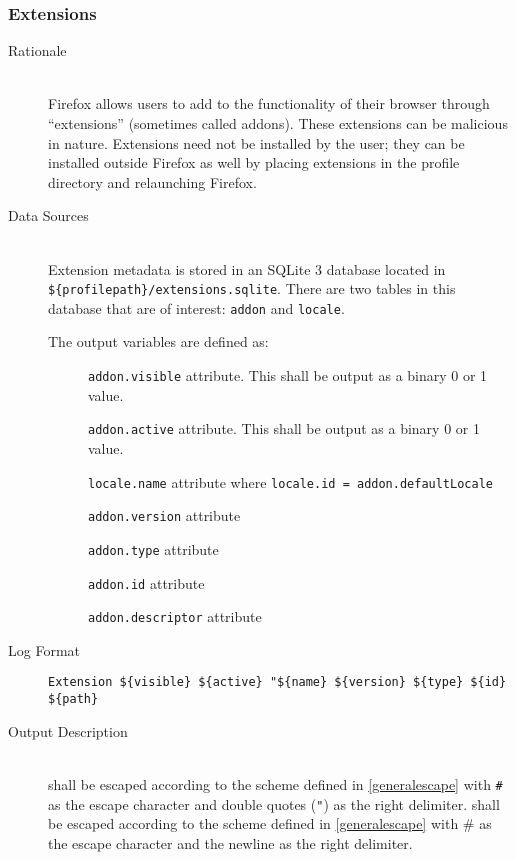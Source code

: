 \subsubsection{Extensions}
\begin{description}
\item[Rationale] \hfill \\
Firefox allows users to add to the functionality of their browser through
``extensions'' (sometimes called addons).  These extensions can be malicious in
nature.  Extensions need not be installed by the user; they can be installed
outside Firefox as well by placing extensions in the profile directory and
relaunching Firefox.  
\item[Data Sources] \hfill \\
Extension metadata is stored in an SQLite 3 database located in \\
\verb|${profilepath}/extensions.sqlite|.  There are two tables in this database
that are of interest: \verb|addon| and \verb|locale|. 
 
The output variables are defined as:
\begin{description}
  \item[] \verb|addon.visible| attribute.  This shall be output as
  a binary 0 or 1 value.
  \item[] \verb|addon.active| attribute.  This shall be output as a
  binary 0 or 1 value.
  \item[] \verb|locale.name| attribute where \texttt{locale.id =
  addon.defaultLocale}
  \item[] \verb|addon.version| attribute
  \item[] \verb|addon.type| attribute
  \item[] \verb|addon.id| attribute
  \item[] \verb|addon.descriptor| attribute
\end{description}
\item[Log Format] \hfill 
\vspace{-\baselineskip}
\begin{verbatim}
Extension ${visible} ${active} "${name} ${version} ${type} ${id} ${path}
\end{verbatim}
\item[Output Description] \hfill \\
 shall be escaped according to the scheme defined in
\ref{generalescape} with \verb|#| as the escape character and double quotes
(\verb|"|) as the right delimiter.   shall be escaped according to
the scheme defined in \ref{generalescape} with \# as the escape character and
the newline as the right delimiter.
  

\end{description}
